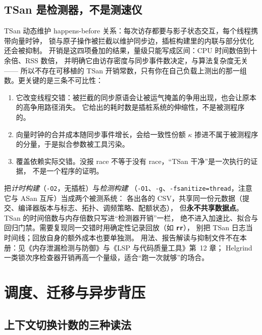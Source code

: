 \documentclass[12pt,a4paper,fontset=fandol]{ctexbook}
\newcommand{\Tp}[1]{\texttt{#1}}
\newcommand{\Lib}[1]{\textbf{\texttt{#1}}}
\begin{document}
\subsection{TSan 是检测器，不是测速仪}
\label{sub:pm09-tsan}

TSan 动态维护 happens-before 关系：每次访存都要与影子状态交互，每个线程携带向量时钟，
锁与原子操作被拦截以维护同步边，插桩构建里的内联与部分优化还会被抑制。
开销是这四项叠加的结果，量级只能写成区间：CPU 时间数倍到十余倍、RSS 数倍，
并明确它由访存密度与同步事件数决定，与算法复杂度无关——
所以不存在可移植的 TSan 开销常数，只有你在自己负载上测出的那一组数。更关键的是三条不可比性：

\begin{enumerate}
\item 它改变线程交错：被拦截的同步原语会让被运气掩盖的争用出现，也会让原本的高争用路径消失。
      它给出的耗时数是插桩系统的伸缩性，不是被测程序的。
\item 向量时钟的合并成本随同步事件增长，会给一致性份额 $\kappa$
      掺进不属于被测程序的分量，于是拟合参数被工具污染。
\item 覆盖依赖实际交错。没报 race 不等于没有 race，``TSan 干净''是一次执行的证据，
      不是一个程序的证明。
\end{enumerate}

\begin{bestpractice}[title={双二进制原则}]
把\emph{计时构建}（\Tp{-O2}，无插桩）与\emph{检测构建}
（\Tp{-O1}、\Tp{-g}、\Tp{-fsanitize=thread}，注意它与 ASan 互斥）当成两个被测系统：
各出各的 CSV，共享同一份元数据（提交、编译器版本与标志、拓扑、调频策略、配额状态），
但\textbf{永不共享数据点}。TSan 的时间倍数与内存倍数只写进``检测器开销''一栏，
绝不进入加速比、拟合与回归门禁。需要复现同一交错时用确定性记录回放（如 \Lib{rr}），
别把 TSan 日志当时间线；回放自身的额外成本也要单独测。
用法、报告解读与抑制文件不在本册：见《内存泄漏检测与防御》与《LSP 与代码质量工具》第~12 章；
Helgrind 一类锁次序检查器开销再高一个量级，适合``跑一次就够''的场合。
\end{bestpractice}

\section{调度、迁移与异步背压}
\label{sec:pm09-sched}

\subsection{上下文切换计数的三种读法}
\end{document}
